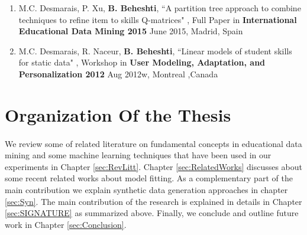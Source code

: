 \begin{enumerate}
\item M.C. Desmarais, P. Xu, \textbf{B. Beheshti}, “A partition tree approach to combine techniques to refine item to skills Q-matrices" , Full Paper  in \textbf{International Educational Data Mining 2015} June 2015, Madrid, Spain
\DIFdelbegin {}\DIFdelend 

\item M.C. Desmarais, R. Naceur, \textbf{B. Beheshti}, “Linear models of student skills for static data" , Workshop in \textbf{User Modeling, Adaptation, and Personalization 2012} Aug 2012w, Montreal ,Canada 
\DIFdelbegin {}\DIFdelend \DIFaddbegin 


\DIFaddend \end{enumerate}


\section{Organization Of the Thesis}
\paragraph{} We review some of related literature on fundamental concepts in educational data mining and some machine learning techniques that have been used in our experiments in Chapter \ref{sec:RevLitt}. Chapter \ref{sec:RelatedWorks} discusses about some recent related works about model fitting. As a complementary part of the main contribution we explain synthetic data generation approaches in chapter \ref{sec:Syn}. The main contribution of the research is explained in details in Chapter \ref{sec:SIGNATURE} as summarized above. Finally, we conclude and outline future work in Chapter \ref{sec:Conclusion}. 


